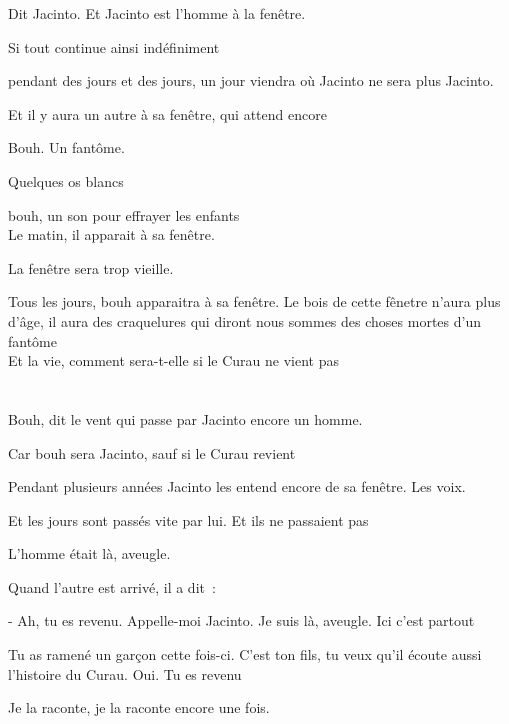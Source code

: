 Dit Jacinto. Et Jacinto est l'homme à la fenêtre.

\clearpage
\thispagestyle{empty}
\movetooddpage

Si tout continue ainsi indéfiniment

pendant des jours et des jours, un jour viendra où Jacinto ne sera plus
Jacinto.

Et il y aura un autre à sa fenêtre, qui attend encore

Bouh. Un fantôme.

Quelques os blancs

bouh, un son pour effrayer les enfants\\

Le matin, il apparait à sa fenêtre.

La fenêtre sera trop vieille.

Tous les jours, bouh apparaitra à sa fenêtre. Le bois de cette fênetre
n'aura plus d'âge, il aura des craquelures qui diront nous sommes des
choses mortes d'un fantôme\\

Et la vie, comment sera-t-elle si le Curau ne vient pas

\pagebreak
\pagecolor{black}

\chapter*{}
\pagecolor{black}\afterpage{\nopagecolor}


\movetoevenpage
Bouh, dit le vent qui passe par Jacinto encore un homme.

Car bouh sera Jacinto, sauf si le Curau revient

\pagebreak

Pendant plusieurs années Jacinto les entend encore de sa fenêtre. Les
voix.

Et les jours sont passés vite par lui. Et ils ne passaient pas

\clearpage
\thispagestyle{empty}
\movetooddpage

L'homme était là, aveugle.

Quand l'autre est arrivé, il a dit~:

- Ah, tu es revenu. Appelle-moi Jacinto. Je suis là, aveugle. Ici c'est
  partout

Tu as ramené un garçon cette fois-ci. C'est ton fils, tu veux qu'il
écoute aussi l'histoire du Curau. Oui. Tu es revenu

Je la raconte, je la raconte encore une fois.

